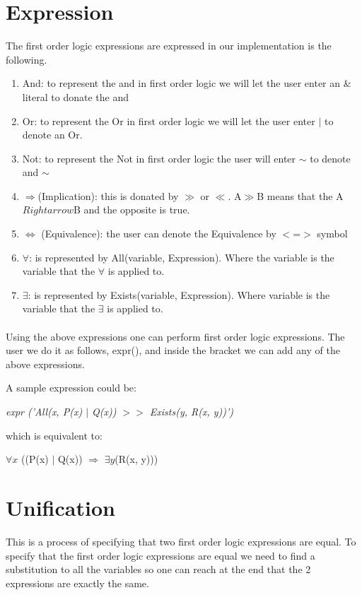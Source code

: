 \label{chap:assign1}{
\section{Expression}
The first order logic expressions are expressed in our implementation is the following.

\begin{enumerate}
\item{And: to represent the and in first order logic we will let the user enter an \& literal to donate the and}
\item{Or: to represent the Or in first order logic we will let the user enter $\mid$ to denote an Or.}
\item{Not: to represent the Not in first order logic the user will enter $\sim$ to denote and $\sim$}
\item{$\Rightarrow$(Implication): this is donated by $\gg$ or $\ll$. A$\gg$B means that the A $Rightarrow$B and the opposite is true.}
\item{$\Leftrightarrow$ (Equivalence): the user can denote the Equivalence by $<$=$>$ symbol}
\item{$\forall$: is represented by All(variable, Expression). Where the variable is the variable that the $\forall$ is applied to.}
\item{$\exists$: is represented by Exists(variable, Expression). Where variable is the variable that the $\exists$ is applied to.}
\end{enumerate}


\paragraph*{}
Using the above expressions one can perform first order logic expressions. The user we do it as follows, expr(), and inside the bracket we can add any of the above expressions. 

A sample expression could be:

\textit{expr ('All(x, P(x) $\mid$ Q(x)) $>$$>$ Exists(y, R(x, y))')}

which is equivalent to:

$\forall{x}$ ((P(x) $\mid$ Q(x)) $\Rightarrow$ $\exists{y}$(R(x, y)))

\section{Unification}
This is a process of specifying that two first order logic expressions are
equal. To specify that the first order logic expressions are equal we need to find a substitution to all the variables so one can reach at the end that the 2 expressions are exactly the same.

}
